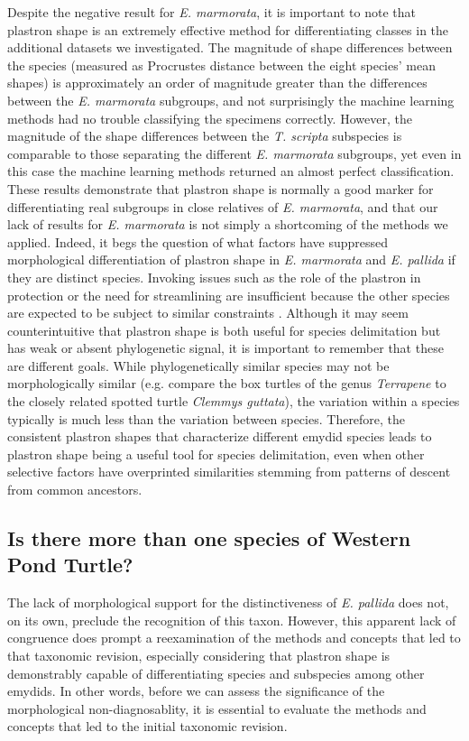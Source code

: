\documentclass[11pt]{article}
\begin{document}
Despite the negative result for \textit{E. marmorata}, it is important to note that plastron shape is an extremely effective method for differentiating classes in the additional datasets we investigated. The magnitude of shape differences between the species (measured as Procrustes distance between the eight species' mean shapes) is approximately an order of magnitude greater than the differences between the \textit{E. marmorata} subgroups, and not surprisingly the machine learning methods had no trouble classifying the specimens correctly. However, the magnitude of the shape differences between the \textit{T. scripta} subspecies is comparable to those separating the different \textit{E. marmorata} subgroups, yet even in this case the machine learning methods returned an almost perfect classification. These results demonstrate that plastron shape is normally a good marker for differentiating real subgroups in close relatives of \textit{E. marmorata}, and that our lack of results for \textit{E. marmorata} is not simply a shortcoming of the methods we applied. Indeed, it begs the question of what factors have suppressed morphological differentiation of plastron shape in \textit{E. marmorata} and \textit{E. pallida} if they are distinct species. Invoking issues such as the role of the plastron in protection or the need for streamlining are insufficient because the other species are expected to be subject to similar constraints \citep{Stayton2011,Polly2016}. Although it may seem counterintuitive that plastron shape is both useful for species delimitation but has weak or absent phylogenetic signal, it is important to remember that these are different goals. While phylogenetically similar species may not be morphologically similar (e.g. compare the box turtles of the genus \textit{Terrapene} to the closely related spotted turtle \textit{Clemmys guttata}), the variation within a species typically is much less than the variation between species. Therefore, the consistent plastron shapes that characterize different emydid species leads to plastron shape being a useful tool for species delimitation, even when other selective factors have overprinted similarities stemming from patterns of descent from common ancestors.

\subsection*{Is there more than one species of Western Pond Turtle?}

The lack of morphological support for the distinctiveness of \textit{E. pallida} does not, on its own, preclude the recognition of this taxon. However, this apparent lack of congruence does prompt a reexamination of the methods and concepts that led to that taxonomic revision, especially considering that plastron shape is demonstrably capable of differentiating species and subspecies among other emydids. In other words, before we can assess the significance of the morphological non-diagnosablity, it is essential to evaluate the methods and concepts that led to the initial taxonomic revision. 
\end{document}
